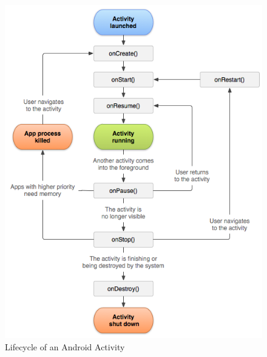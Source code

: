 \begin{figure}[H]
	\centering
	\includegraphics[width=\textwidth]{Pictures/activity_lifecycle.png}
	\caption{Lifecycle of an Android Activity}
	\label{fig:lifecycle}
\end{figure}